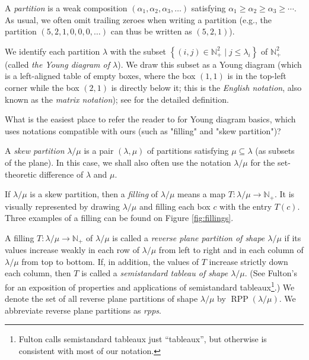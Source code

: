 \documentclass[numbers=enddot,12pt,final,onecolumn,notitlepage]{scrartcl}%
\theoremstyle{definition}
\newenvironment{todo}{}{}
\newcommand{\Nplus}{\mathbb{N}_{+}}
\def\lm{{\lambda/\mu}}
\begin{document}
A \textit{partition} is a weak composition $\left(  \alpha_{1},\alpha
_{2},\alpha_{3},\ldots\right)  $ satisfying $\alpha_{1}\geq\alpha_{2}
\geq\alpha_{3}\geq\cdots$.
As usual, we often omit trailing zeroes when writing a partition (e.g.,
the partition $\left(5,2,1,0,0,0,\ldots\right)$ can thus be written as
$\left(5,2,1\right)$).

We identify each partition $\lambda$ with the subset
$\left\{ \left( i, j \right) \in \Nplus^2 \mid j \leq \lambda_i \right\}$
of $\Nplus^{2}$ (called \textit{the Young diagram of $\lambda$}).
We draw this subset as a Young diagram (which is a left-aligned table of
empty boxes, where the box $(1,1)$ is in the top-left corner while the
box $(2,1)$ is directly below it; this is the \textit{English notation},
also known as the \textit{matrix notation}); see \cite{Fulton97} for
the detailed definition.


\begin{todo}
What is the easiest place to refer the reader to for Young diagram basics,
which uses notations compatible with ours (such as "filling" and "skew
partition")?
\end{todo}

A \textit{skew partition} $\lambda/\mu$ is a pair $\left(\lambda, \mu\right)$ of partitions satisfying $\mu\subseteq\lambda$ (as subsets of the plane). In this case, we shall also often use the notation $\lambda/\mu$ for the set-theoretic difference of $\lambda$ and $\mu$.

 If $\lm$ is a skew partition, then a \textit{filling} of $\lm$ means a map $T:\lm\rightarrow\Nplus$. It is visually represented by drawing $\lm$ and filling each box $c$ with the entry $T(c)$. Three examples of a filling can be found on Figure \ref{fig:fillings}.
 

 A filling $T:\lm\rightarrow\Nplus$ of $\lm$ is called a \textit{reverse plane partition of shape $\lm$} if its values increase weakly in each row of $\lm$ from left to right and in each column of $\lm$ from top to bottom. If, in addition, the values of $T$ increase strictly down each column, then $T$ is called a \textit{semistandard tableau of shape $\lm$}. (See Fulton's \cite{Fulton97} for an exposition of properties and applications of semistandard tableaux\footnote{Fulton calls semistandard tableaux just ``tableaux'', but otherwise is consistent with most of our notation.}.) We denote the set of all reverse plane partitions of shape $\lm$ by $\operatorname{RPP}\left(  \lambda/\mu\right)$.  We abbreviate reverse plane partitions as \textit{rpps}. 
 
\end{document}

